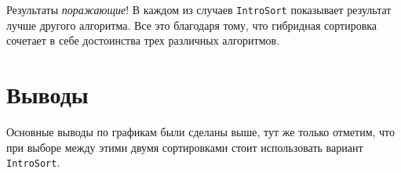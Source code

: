 \documentclass[11pt,a4paper]{scrarticle}
\theoremstyle{definition}
\begin{document}
Результаты \emph{поражающие}! В каждом из случаев \texttt{IntroSort} показывает результат лучше другого алгоритма. Все это благодаря тому, что гибридная сортировка сочетает в себе достоинства трех различных алгоритмов.

\section*{Выводы}

Основные выводы по графикам были сделаны выше, тут же только отметим, что  при выборе между этими двумя сортировками стоит использовать вариант \texttt{IntroSort}.
\end{document}
